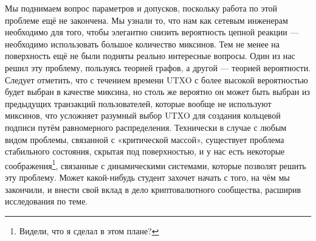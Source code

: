 \documentclass{mrl}
\begin{document}
Мы поднимаем вопрос параметров и допусков, поскольку работа по этой проблеме ещё не закончена. Мы узнали то, что нам как сетевым инженерам необходимо для того, чтобы элегантно снизить вероятность цепной реакции — необходимо использовать большое количество миксинов. Тем не менее на поверхность ещё не были подняты реально интересные вопросы. Один из нас решил эту проблему, пользуясь теорией графов, а другой — теорией вероятности. Следует отметить, что с течением времени UTXO с более высокой вероятностью будет выбран в качестве миксина, но столь же вероятно он может быть выбран из предыдущих транзакций пользователей, которые вообще не используют миксинов, что усложняет разумный выбор UTXO для создания кольцевой подписи путём равномерного распределения. Технически в случае с любым видом проблемы, связанной с «критической массой», существует проблема стабильного состояния, скрытая под поверхностью, и у нас есть некоторые соображения\footnote{Видели, что я сделал в этом плане?}, связанные с динамическими системами, которые позволят решить эту проблему. Может какой-нибудь студент захочет начать с того, на чём мы закончили, и внести свой вклад в дело криптовалютного сообщества, расширив исследования по теме.
\end{document}
